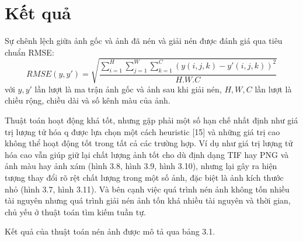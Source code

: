 \section{Kết quả}
\par Sự chênh lệch giữa ảnh gốc và ảnh đã nén và giải nén được đánh giá qua tiêu chuẩn RMSE:
$$RMSE(y, y') = \sqrt {\frac{{\sum\limits_{i = 1}^H {\sum\limits_{j = 1}^W {\sum\limits_{k = 1}^C {{{(y(i,j,k) - y'(i,j,k))}^2}} } } }}{{H.W.C}}}$$
với $y, y'$ lần lượt là ma trận ảnh gốc và ảnh sau khi giải nén, $H, W, C$ lần lượt là chiều rộng, chiều dài và số kênh màu của ảnh.
\par Thuật toán hoạt động khá tốt, nhưng gặp phải một số hạn chế nhất định như giá trị lượng tử hóa q được lựa chọn một cách heuristic [15] và những giá trị cao không thể hoạt động tốt trong tất cả các trường hợp. Ví dụ như giá trị lượng tử hóa cao vẫn giúp giữ lại chất lượng ảnh tốt cho dù định dạng TIF hay PNG và ảnh màu hay ảnh xám (hình 3.8, hình 3.9, hình 3.10), nhưng lại gây ra hiện tượng thay đổi rõ rệt chất lượng trong một số ảnh, đặc biệt là ảnh kích thước nhỏ (hình 3.7, hình 3.11). Và bên cạnh việc quá trình nén ảnh không tốn nhiều tài nguyên nhưng quá trình giải nén ảnh tốn khá nhiều tài nguyên và thời gian, chủ yếu ở thuật toán tìm kiếm tuần tự.
\par Kết quả của thuật toán nén ảnh được mô tả qua bảng 3.1.
\vspace{10mm}
